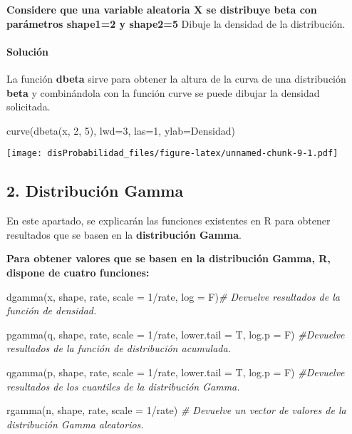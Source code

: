\documentclass[
]{article}
\newenvironment{Shaded}{\begin{snugshade}}{\end{snugshade}}
\newcommand{\AttributeTok}[1]{\textcolor[rgb]{0.77,0.63,0.00}{#1}}
\newcommand{\CommentTok}[1]{\textcolor[rgb]{0.56,0.35,0.01}{\textit{#1}}}
\newcommand{\DecValTok}[1]{\textcolor[rgb]{0.00,0.00,0.81}{#1}}
\newcommand{\FunctionTok}[1]{\textcolor[rgb]{0.00,0.00,0.00}{#1}}
\newcommand{\NormalTok}[1]{#1}
\newcommand{\SpecialCharTok}[1]{\textcolor[rgb]{0.00,0.00,0.00}{#1}}
\newcommand{\StringTok}[1]{\textcolor[rgb]{0.31,0.60,0.02}{#1}}
\begin{document}
\textbf{Considere que una variable aleatoria X se distribuye beta con
parámetros shape1=2 y shape2=5} Dibuje la densidad de la distribución.

\hypertarget{soluciuxf3n-1}{%
\paragraph{Solución}\label{soluciuxf3n-1}}

La función \textbf{dbeta} sirve para obtener la altura de la curva de
una distribución \textbf{beta} y combinándola con la función curve se
puede dibujar la densidad solicitada.

\begin{Shaded}
\begin{Highlighting}[]
\FunctionTok{curve}\NormalTok{(}\FunctionTok{dbeta}\NormalTok{(x, }\DecValTok{2}\NormalTok{, }\DecValTok{5}\NormalTok{), }\AttributeTok{lwd=}\DecValTok{3}\NormalTok{, }\AttributeTok{las=}\DecValTok{1}\NormalTok{, }\AttributeTok{ylab=}\StringTok{\textquotesingle{}Densidad\textquotesingle{}}\NormalTok{)}
\end{Highlighting}
\end{Shaded}

\texttt{[image: disProbabilidad\_files/figure-latex/unnamed-chunk-9-1.pdf]}

\hypertarget{distribuciuxf3n-gamma}{%
\subsection{2. Distribución Gamma}\label{distribuciuxf3n-gamma}}

En este apartado, se explicarán las funciones existentes en R para
obtener resultados que se basen en la \textbf{distribución Gamma}.

\textbf{Para obtener valores que se basen en la distribución Gamma, R,
dispone de cuatro funciones:}

\begin{Shaded}
\begin{Highlighting}[]
\FunctionTok{dgamma}\NormalTok{(x, shape, rate, }\AttributeTok{scale =} \DecValTok{1}\SpecialCharTok{/}\NormalTok{rate, }\AttributeTok{log =}\NormalTok{ F)}\CommentTok{\#    Devuelve resultados de la función de densidad.}

\FunctionTok{pgamma}\NormalTok{(q, shape, rate, }\AttributeTok{scale =} \DecValTok{1}\SpecialCharTok{/}\NormalTok{rate, }\AttributeTok{lower.tail =}\NormalTok{ T, }\AttributeTok{log.p =}\NormalTok{ F)   }\CommentTok{\#Devuelve resultados de la función de distribución acumulada.}

\FunctionTok{qgamma}\NormalTok{(p, shape, rate, }\AttributeTok{scale =} \DecValTok{1}\SpecialCharTok{/}\NormalTok{rate, }\AttributeTok{lower.tail =}\NormalTok{ T, }\AttributeTok{log.p =}\NormalTok{ F)   }\CommentTok{\#Devuelve resultados de los cuantiles de la distribución Gamma.}

\FunctionTok{rgamma}\NormalTok{(n, shape, rate, }\AttributeTok{scale =} \DecValTok{1}\SpecialCharTok{/}\NormalTok{rate) }\CommentTok{\#    Devuelve un vector de valores de la distribución Gamma aleatorios.}
\end{Highlighting}
\end{Shaded}
\end{document}
